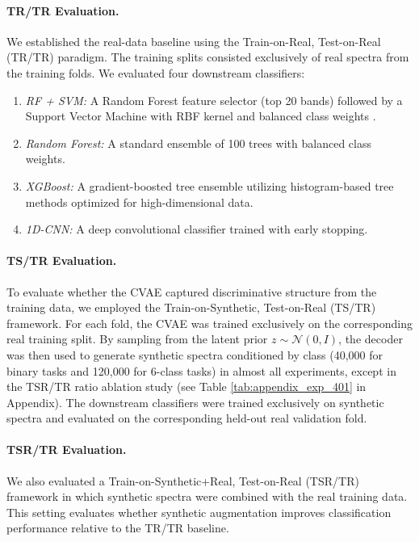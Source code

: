 \paragraph{TR/TR Evaluation.} 
We established the real-data baseline using the Train-on-Real, Test-on-Real (TR/TR) paradigm. The training splits consisted exclusively of real spectra from the training folds. We evaluated four downstream classifiers:
\begin{enumerate}
    \item \emph{RF + SVM:} A Random Forest feature selector (top 20 bands) followed by a Support Vector Machine with RBF kernel and balanced class weights \cite{apollonov2024raman}.
    
    \item \emph{Random Forest:} A standard ensemble of 100 trees with balanced class weights.
    
    \item \emph{XGBoost:} A gradient-boosted tree ensemble utilizing histogram-based tree methods optimized for high-dimensional data.
    
    \item \emph{1D-CNN:} A deep convolutional classifier trained with early stopping.
\end{enumerate}

\paragraph{TS/TR Evaluation.}
To evaluate whether the CVAE captured discriminative structure from the training data, we employed the Train-on-Synthetic, Test-on-Real (TS/TR) framework. For each fold, the CVAE was trained exclusively on the corresponding real training split. By sampling from the latent prior $z \sim \mathcal{N}(0, I)$, the decoder was then used to generate synthetic spectra conditioned by class (40,000 for binary tasks and 120,000 for 6-class tasks) in almost all experiments, except in the TSR/TR ratio ablation study (see Table \ref{tab:appendix_exp_401} in Appendix). The downstream classifiers were trained exclusively on synthetic spectra and evaluated on the corresponding held-out real validation fold.

\paragraph{TSR/TR Evaluation.}
We also evaluated a Train-on-Synthetic+Real, Test-on-Real (TSR/TR) framework in which synthetic spectra were combined with the real training data. This setting evaluates whether synthetic augmentation improves classification performance relative to the TR/TR baseline.

